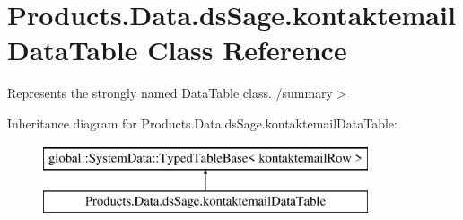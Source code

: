\hypertarget{class_products_1_1_data_1_1ds_sage_1_1kontaktemail_data_table}{}\section{Products.\+Data.\+ds\+Sage.\+kontaktemail\+Data\+Table Class Reference}
\label{class_products_1_1_data_1_1ds_sage_1_1kontaktemail_data_table}


Represents the strongly named Data\+Table class. /summary$>$  


Inheritance diagram for Products.\+Data.\+ds\+Sage.\+kontaktemail\+Data\+Table\+:\begin{figure}[H]
\begin{center}
\leavevmode
\includegraphics[height=2.000000cm]{class_products_1_1_data_1_1ds_sage_1_1kontaktemail_data_table}
\end{center}
\end{figure}
